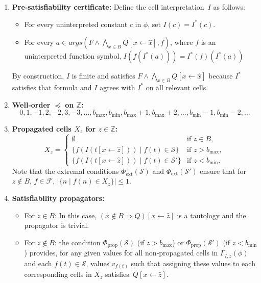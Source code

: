 \documentclass[runningheads]{llncs}
\newcommand{\subst}[3]{#1[#2\leftarrow #3]}
\newcommand{\repr}[1]{\hat{#1}}
\begin{document}
\begin{enumerate}
    \item \textbf{Pre‑satisfiability certificate:} Define the cell interpretation~$I$ as follows:
      \begin{itemize}
        \item For every uninterpreted constant $c$ in $\phi$, set $I(c)=I^*(c)$.
        \item For every $a\in args(F \land \bigwedge_{x \in B} \subst{Q}{x}{\repr{x}}, f)$,  where $f$ is an uninterpreted function symbol, $I(f(I^*(a)))=I^*(f)(I^{*}(a))$
    \end{itemize}
    By construction, $I$ is finite and satisfies $F \land \bigwedge_{x \in B} \subst{Q}{x}{\repr{x}}$ because $I^*$ satisfies that formula and $I$ agrees with $I^*$ on all relevant cells.
       
    \item \textbf{Well‑order $\preceq$ on $\mathbb{Z}$:}
    \[0, 1, -1, 2, -2, 3, -3, \dots, b_{\max}, b_{\min},b_{\max}+1, b_{\max}+2, \dots,b_{\min}-1, b_{\min}-2, \dots\]		
    
  \item \textbf{Propagated cells $X_z$ for $z \in \mathbb{Z}$:}
    \[
    X_z = 
    \begin{cases}
    \emptyset & \text{if } z \in B, \\[4pt]
    \bigl\{ f(I(\subst{t}{x}{\hat{z}})) \mid f(t)\in\mathcal{S} \bigr\} & \text{if } z > b_{\max}, \\[4pt]
    \bigl\{ f(I(\subst{t}{x}{\hat{z}})) \mid f(t)\in\mathcal{S}' \bigr\} & \text{if } z < b_{\min}.
    \end{cases}
    \]
    Note that the extremal conditions $\Phi^+_{\text{ext}}(\mathcal{S})$ and $\Phi^-_{\text{ext}}(\mathcal{S}')$ ensure that for $z\not\in B$, $f\in\mathcal{F}$, $|\{ n \mid f(n)\in X_z\}|\leq 1$.

    \item \textbf{Satisfiability propagators:}
    \begin{itemize}
        \item For $z \in B$: In this case, $\subst{(x\not\in B \Rightarrow Q)}{x}{\hat{z}}$ is a tautology and the propagator is trivial.
        \item For $z\not\in B$: the condition $\Phi_{\text{prop}}(\mathcal{S})$ (if $z > b_{\max}$) or $\Phi_{\text{prop}}(\mathcal{S}')$ (if $z < b_{\min}$) provides, for any given values for all non‑propagated cells in $\Gamma_{I,z}(\phi)$ and each $f(t)\in\mathcal{S}$, values $v_{f(t)}$  such that assigning these values to each corresponding cells in $X_z$ satisfies~$\subst{Q}{x}{\repr{z}}$.
    \end{itemize}
\end{enumerate}
\end{document}
